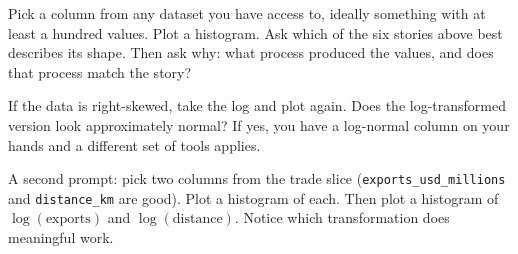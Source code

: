 \documentclass[
  letterpaper,
  11pt,
  twoside,
  openany]{scrbook}
\begin{document}
\begin{tcolorbox}[enhanced jigsaw, arc=.35mm, bottomrule=.15mm, bottomtitle=1mm, breakable, colback=white, colbacktitle=quarto-callout-tip-color!10!white, colframe=quarto-callout-tip-color-frame, coltitle=black, left=2mm, leftrule=.75mm, opacityback=0, opacitybacktitle=0.6, rightrule=.15mm, title=\textcolor{quarto-callout-tip-color}{\faLightbulb}\hspace{0.5em}{Try this}, titlerule=0mm, toprule=.15mm, toptitle=1mm]

Pick a column from any dataset you have access to, ideally something
with at least a hundred values. Plot a histogram. Ask which of the six
stories above best describes its shape. Then ask why: what process
produced the values, and does that process match the story?

If the data is right-skewed, take the log and plot again. Does the
log-transformed version look approximately normal? If yes, you have a
log-normal column on your hands and a different set of tools applies.

A second prompt: pick two columns from the trade slice
(\texttt{exports\_usd\_millions} and \texttt{distance\_km} are good).
Plot a histogram of each. Then plot a histogram of
\(\log(\text{exports})\) and \(\log(\text{distance})\). Notice which
transformation does meaningful work.

\end{tcolorbox}
\end{document}
